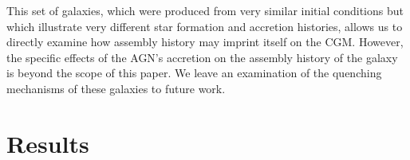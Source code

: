 \documentclass[]{emulateapj}
\begin{document}
This set of galaxies, which were produced from very similar initial conditions but which illustrate very different star formation and accretion histories, allows us to directly examine how assembly history may imprint itself on the CGM. However, the specific effects of the AGN's accretion on the assembly history of the galaxy is beyond the scope of this paper. We leave an examination of the quenching mechanisms of these galaxies to future work. 




\section{Results}\label{redux}
\end{document}
